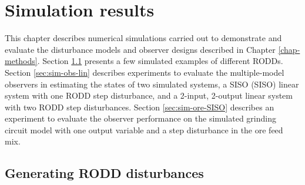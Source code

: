 \chapter{Simulation results}  \label{chap-simulation}
%
This chapter describes numerical simulations carried out to demonstrate and evaluate the disturbance models and observer designs described in Chapter \ref{chap-methods}. Section \ref{sec:sim-RODDs} presents a few simulated examples of different \gls{RODD}s. Section \ref{sec:sim-obs-lin} describes experiments to evaluate the multiple-model observers in estimating the states of two simulated systems, a \acrlong{SISO} (\acrshort{SISO}) linear system with one \gls{RODD} step disturbance, and a 2-input, 2-output linear system with two \gls{RODD} step disturbances. Section \ref{sec:sim-ore-SISO} describes an experiment to evaluate the observer performance on the simulated grinding circuit model with one output variable and a step disturbance in the ore feed mix. %


\section{Generating RODD disturbances} \label{sec:sim-RODDs}

